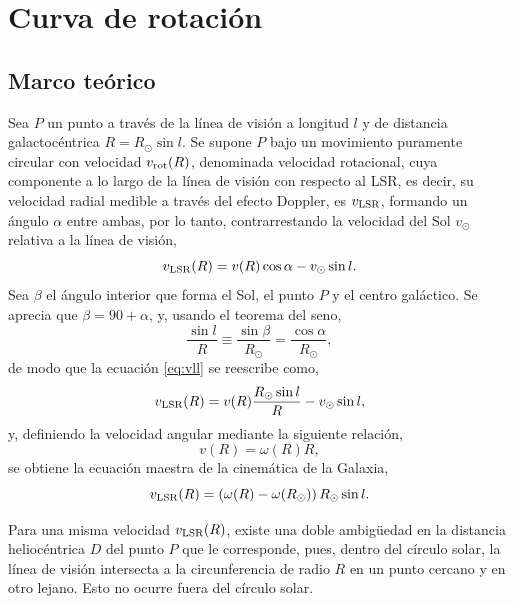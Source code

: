 \section{Curva de rotación}

\subsection{Marco teórico}

Sea $P$ un punto a través de la línea de visión a longitud $l$ y de distancia galactocéntrica $R=R_\odot\sin l$. Se supone $P$ bajo un movimiento puramente circular con velocidad $v_\textnormal{rot}(R)$, denominada velocidad rotacional, cuya componente a lo largo de la línea de visión con respecto al LSR, es decir, su velocidad radial medible a través del efecto Doppler, es $v_\textnormal{LSR}$, formando un ángulo $\alpha$ entre ambas, por lo tanto, contrarrestando la velocidad del Sol $v_\odot$ relativa a la línea de visión,
\begin{equation}
v_\textnormal{LSR}(R)=v(R)\cos\alpha-v_\odot\sin l
.\label{eq:vll}\end{equation}
Sea $\beta$ el ángulo interior que forma el Sol, el punto $P$ y el centro galáctico. Se aprecia que $\beta=90+\alpha$, y, usando el teorema del seno,
\begin{equation}
\frac{\sin l}{R}\equiv\frac{\sin\beta}{R_\odot}=\frac{\cos\alpha}{R_\odot}
,\end{equation}
de modo que la ecuación \ref{eq:vll} se reescribe como,
\begin{equation}
v_\textnormal{LSR}(R)=v(R)\frac{R_\odot\sin l}{R}-v_\odot\sin l
,\label{eq:nomaestra}
\end{equation}
y, definiendo la velocidad angular mediante la siguiente relación,
\begin{equation}
v(R)=\omega(R)R
,\end{equation}
se obtiene la ecuación maestra de la cinemática de la Galaxia,
\begin{equation}
v_\textnormal{LSR}(R)=\left(\omega(R)-\omega(R_\odot)\right)R_\odot\sin l
.\label{eq:maestra}\end{equation}

Para una misma velocidad $v_\textnormal{LSR}(R)$, existe una doble ambigüedad en la distancia heliocéntrica $D$ del punto $P$ que le corresponde, pues, dentro del círculo solar, la línea de visión intersecta a la circunferencia de radio $R$ en un punto cercano y en otro lejano. Esto no ocurre fuera del círculo solar.

